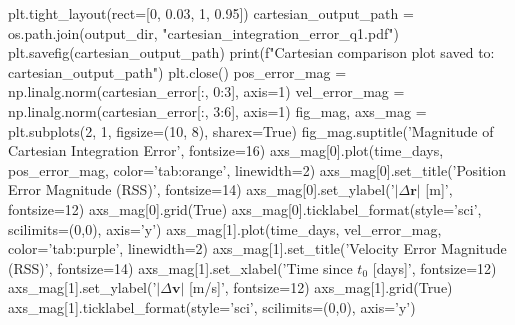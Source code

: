 {}plt.tight_layout(rect=[0, 0.03, 1, 0.95])\markdownRendererInterblockSeparator
{}
\markdownRendererSectionEnd \markdownRendererSectionBegin
{}\markdownRendererInterblockSeparator
{}cartesian_output_path = os.path.join(output_dir, "cartesian_integration_error_q1.pdf") plt.savefig(cartesian_output_path) print(f"Cartesian comparison plot saved to: {cartesian_output_path}") plt.close()\markdownRendererInterblockSeparator
{}
\markdownRendererSectionEnd \markdownRendererSectionBegin
{}\markdownRendererInterblockSeparator
{}
\markdownRendererSectionEnd \markdownRendererSectionBegin
{}\markdownRendererInterblockSeparator
{}
\markdownRendererSectionEnd \markdownRendererSectionBegin
{}\markdownRendererInterblockSeparator
{}pos_error_mag = np.linalg.norm(cartesian_error[:, 0:3], axis=1) vel_error_mag = np.linalg.norm(cartesian_error[:, 3:6], axis=1)\markdownRendererInterblockSeparator
{}
\markdownRendererSectionEnd \markdownRendererSectionBegin
{}\markdownRendererInterblockSeparator
{}fig_mag, axs_mag = plt.subplots(2, 1, figsize=(10, 8), sharex=True) fig_mag.suptitle('Magnitude of Cartesian Integration Error', fontsize=16)\markdownRendererInterblockSeparator
{}
\markdownRendererSectionEnd \markdownRendererSectionBegin
{}\markdownRendererInterblockSeparator
{}axs_mag[0].plot(time_days, pos_error_mag, color='tab:orange', linewidth=2) axs_mag[0].set_title('Position Error Magnitude (RSS)', fontsize=14) axs_mag[0].set_ylabel('$|\Delta \mathbf{r}|$ [m]', fontsize=12) axs_mag[0].grid(True) axs_mag[0].ticklabel_format(style='sci', scilimits=(0,0), axis='y')\markdownRendererInterblockSeparator
{}
\markdownRendererSectionEnd \markdownRendererSectionBegin
{}\markdownRendererInterblockSeparator
{}axs_mag[1].plot(time_days, vel_error_mag, color='tab:purple', linewidth=2) axs_mag[1].set_title('Velocity Error Magnitude (RSS)', fontsize=14) axs_mag[1].set_xlabel('Time since $t_0$ [days]', fontsize=12) axs_mag[1].set_ylabel('$|\Delta \mathbf{v}|$ [m/s]', fontsize=12) axs_mag[1].grid(True) axs_mag[1].ticklabel_format(style='sci', scilimits=(0,0), axis='y')\markdownRendererInterblockSeparator
{}
\markdownRendererSectionEnd \markdownRendererSectionBegin

